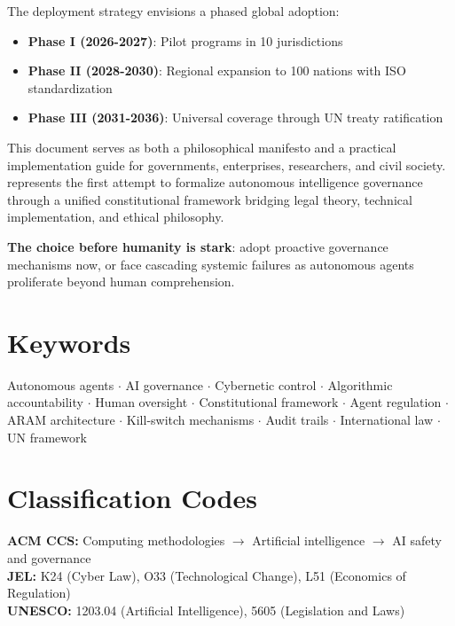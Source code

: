 \begin{executivebox}
\vspace{0.5cm}

The deployment strategy envisions a phased global adoption:

\begin{itemize}[leftmargin=1.5cm]
    \item \textbf{Phase I (2026-2027)}: Pilot programs in 10 jurisdictions
    \item \textbf{Phase II (2028-2030)}: Regional expansion to 100 nations with ISO standardization
    \item \textbf{Phase III (2031-2036)}: Universal coverage through UN treaty ratification
\end{itemize}

\vspace{0.5cm}

This document serves as both a philosophical manifesto and a practical implementation guide for governments, enterprises, researchers, and civil society. \lairm{} represents the first attempt to formalize autonomous intelligence governance through a unified constitutional framework bridging legal theory, technical implementation, and ethical philosophy.

\vspace{0.5cm}

\textbf{The choice before humanity is stark}: adopt proactive governance mechanisms now, or face cascading systemic failures as autonomous agents proliferate beyond human comprehension.
\end{executivebox}

\vspace{1cm}

\section*{Keywords}
\noindent
Autonomous agents $\cdot$ AI governance $\cdot$ Cybernetic control $\cdot$ Algorithmic accountability $\cdot$ Human oversight $\cdot$ Constitutional framework $\cdot$ Agent regulation $\cdot$ ARAM architecture $\cdot$ Kill-switch mechanisms $\cdot$ Audit trails $\cdot$ International law $\cdot$ UN framework

\section*{Classification Codes}
\noindent
\textbf{ACM CCS:} Computing methodologies $\rightarrow$ Artificial intelligence $\rightarrow$ AI safety and governance\\
\textbf{JEL:} K24 (Cyber Law), O33 (Technological Change), L51 (Economics of Regulation)\\
\textbf{UNESCO:} 1203.04 (Artificial Intelligence), 5605 (Legislation and Laws)


